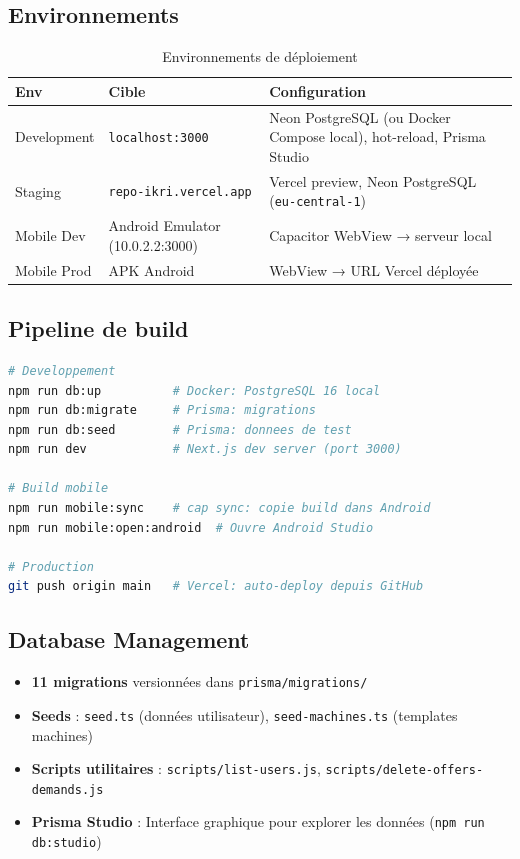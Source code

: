 \documentclass[12pt, a4paper]{article}
\begin{document}
\subsection{Environnements}

\begin{table}[h!]
\centering
\caption{Environnements de déploiement}
\begin{tabularx}{\textwidth}{l l X}
\toprule
\textbf{Env} & \textbf{Cible} & \textbf{Configuration} \\
\midrule
Development  & \texttt{localhost:3000}         & Neon PostgreSQL (ou Docker Compose local), hot-reload, Prisma Studio \\
Staging      & \texttt{repo-ikri.vercel.app}   & Vercel preview, Neon PostgreSQL (\texttt{eu-central-1}) \\
Mobile Dev   & Android Emulator (10.0.2.2:3000) & Capacitor WebView → serveur local \\
Mobile Prod  & APK Android                     & WebView → URL Vercel déployée \\
\bottomrule
\end{tabularx}
\end{table}

\subsection{Pipeline de build}

\begin{lstlisting}[language=bash, caption=Pipeline de developpement]
# Developpement
npm run db:up          # Docker: PostgreSQL 16 local
npm run db:migrate     # Prisma: migrations
npm run db:seed        # Prisma: donnees de test
npm run dev            # Next.js dev server (port 3000)

# Build mobile
npm run mobile:sync    # cap sync: copie build dans Android
npm run mobile:open:android  # Ouvre Android Studio

# Production
git push origin main   # Vercel: auto-deploy depuis GitHub
\end{lstlisting}

\subsection{Database Management}

\begin{itemize}[leftmargin=2em]
  \item \textbf{11 migrations} versionnées dans \texttt{prisma/migrations/}
  \item \textbf{Seeds} : \texttt{seed.ts} (données utilisateur), \texttt{seed-machines.ts} (templates machines)
  \item \textbf{Scripts utilitaires} : \texttt{scripts/list-users.js}, \texttt{scripts/delete-offers-demands.js}
  \item \textbf{Prisma Studio} : Interface graphique pour explorer les données (\texttt{npm run db:studio})
\end{itemize}
\end{document}
